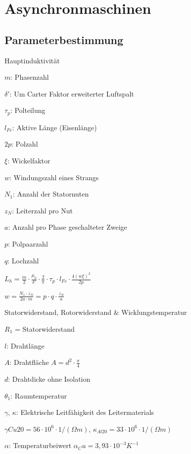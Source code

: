 \documentclass[german]{latex4ei/latex4ei_sheet}
\begin{document}
	\section{Asynchronmaschinen}
		\begin{sectionbox}
			\subsection{Parameterbestimmung}
				\begin{symbolbox}{Hauptinduktivität}
					\item $m$: Phasenzahl
					\item $\delta'$: Um Carter Faktor erweiterter Luftspalt
					\item $\tau_p$: Polteilung
					\item $l_{Fe}$: Aktive Länge (Eisenlänge)
					\item $2p$: Polzahl
					\item $\xi$: Wickelfaktor
					\item $w$: Windungszahl eines Strangs
					\item $N_1$: Anzahl der Statornuten
					\item $z_N$: Leiterzahl pro Nut
					\item $a$: Anzahl pro Phase geschalteter Zweige
					\item $p$: Polpaarzahl
					\item $q$: Lochzahl
					\item $L_h = \frac{m}{2}\cdot \frac{\mu_0}{\delta'}\cdot \frac{2}{\pi}\cdot \tau_p \cdot l_{Fe}\cdot \frac{4(w\xi)^2}{2p}$
					\item $w= \frac{N_1\cdot z_N}{2a\cdot m} = p\cdot q \cdot \frac{z_N}{a}$
				\end{symbolbox}
				\begin{bluebox}{Statorwiderstand, Rotorwiderstand \& Wicklungstemperatur}
					\item $R_1$ = Statorwiderstand
					\item $l$: Drahtlänge
					\item $A$: Drahtfläche $A = d^2\cdot \frac{\pi}{4}$
					\item $d$: Drahtdicke ohne Isolation
					\item $\theta_1$: Raumtemperatur
					\item $\gamma$, $\kappa$: Elektrische Leitfähigkeit des Leitermaterials
					\item $\gamma{Cu20} = 56\cdot 10^6\cdot 1/(\Omega m)$, $\kappa_{Al20} = 33\cdot 10^6\cdot 1/(\Omega m)$
					\item $\alpha$: Temperaturbeiwert $\alpha_Cu = 3,93\cdot 10^{-3}K^{-1}$

\end{bluebox}
\end{sectionbox}
\end{document}
